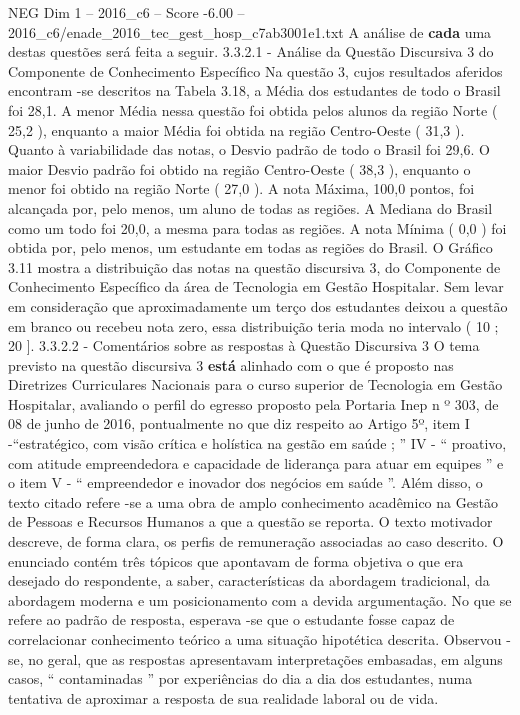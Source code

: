 \begin{textsample}{NEG Dim 1 – 2016\_c6 – Score -6.00 – 2016\_c6/enade\_2016\_tec\_gest\_hosp\_c7ab3001e1.txt}
A análise de \textbf{cada} uma destas questões será feita a seguir. 3.3.2.1 - Análise da Questão Discursiva 3 do Componente de Conhecimento Específico Na questão 3, cujos resultados aferidos encontram -se descritos na Tabela 3.18, a Média dos estudantes de todo o Brasil foi 28,1.
A menor Média nessa questão foi obtida pelos alunos da região Norte ( 25,2 ), enquanto a maior Média foi obtida na região Centro-Oeste ( 31,3 ).
Quanto à variabilidade das notas, o Desvio padrão de todo o Brasil foi 29,6.
O maior Desvio padrão foi obtido na região Centro-Oeste ( 38,3 ), enquanto o menor foi obtido na região Norte ( 27,0 ).
A nota Máxima, 100,0 pontos, foi alcançada por, pelo menos, um aluno de todas as regiões.
A Mediana do Brasil como um todo foi 20,0, a mesma para todas as regiões.
A nota Mínima ( 0,0 ) foi obtida por, pelo menos, um estudante em todas as regiões do Brasil.
O Gráfico 3.11 mostra a distribuição das notas na questão discursiva 3, do Componente de Conhecimento Específico da área de Tecnologia em Gestão Hospitalar.
Sem levar em consideração que aproximadamente um terço dos estudantes deixou a questão em branco ou recebeu nota zero, essa distribuição teria moda no intervalo ( 10 ; 20 ]. 3.3.2.2 - Comentários sobre as respostas à Questão Discursiva 3 O tema previsto na questão discursiva 3 \textbf{está} alinhado com o que é proposto nas Diretrizes Curriculares Nacionais para o curso superior de Tecnologia em Gestão Hospitalar, avaliando o perfil do egresso proposto pela Portaria Inep n º 303, de 08 de junho de 2016, pontualmente no que diz respeito ao Artigo 5º, item I -“estratégico, com visão crítica e holística na gestão em saúde ; ” IV - “ proativo, com atitude empreendedora e capacidade de liderança para atuar em equipes ” e o item V - “ empreendedor e inovador dos negócios em saúde ”.
Além disso, o texto citado refere -se a uma obra de amplo conhecimento acadêmico na Gestão de Pessoas e Recursos Humanos a que a questão se reporta.
O texto motivador descreve, de forma clara, os perfis de remuneração associadas ao caso descrito.
O enunciado contém três tópicos que apontavam de forma objetiva o que era desejado do respondente, a saber, características da abordagem tradicional, da abordagem moderna e um posicionamento com a devida argumentação.
No que se refere ao padrão de resposta, esperava -se que o estudante fosse capaz de correlacionar conhecimento teórico a uma situação hipotética descrita.
Observou -se, no geral, que as respostas apresentavam interpretações embasadas, em alguns casos, “ contaminadas ” por experiências do dia a dia dos estudantes, numa tentativa de aproximar a resposta de sua realidade laboral ou de vida.

\end{textsample}
